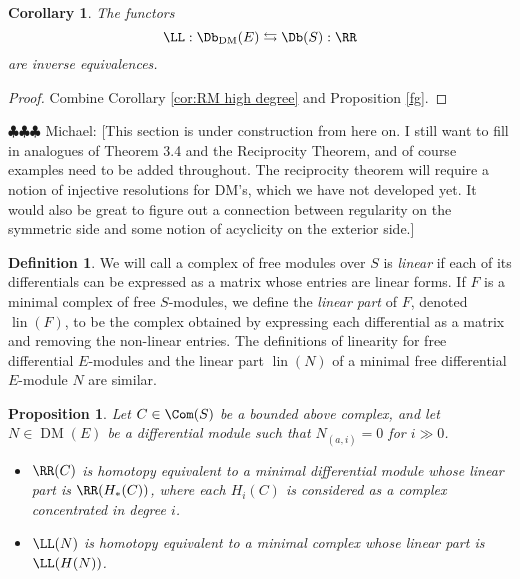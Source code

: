 \documentclass[12pt]{amsart}
\newtheorem{prop}[lemma]{Proposition}
\newtheorem{cor}[lemma]{Corollary}
\theoremstyle{definition}
\newtheorem{defn}[lemma]{Definition}
\theoremstyle{remark}
\newcommand{\michael}[1]{{\color{red} \sf $\clubsuit\clubsuit\clubsuit$ Michael: [#1]}}
\def\on{\operatorname}
\def\DM{\operatorname{DM}}
\begin{document}
\begin{cor} 
\label{bddderived}
The functors
$$
\LL : \Db_{\DM}(E) \leftrightarrows \Db(S) : \RR
$$
are inverse equivalences.
\end{cor}

\begin{proof}
Combine Corollary \ref{cor:RM high degree} and Proposition \ref{fg}.
\end{proof}

\michael{This section is under construction from here on. I still want to fill in analogues of \cite{EFS} Theorem 3.4 and the Reciprocity Theorem, and of course examples need to be added throughout. The reciprocity theorem will require a notion of injective resolutions for DM's, which we have not developed yet. It would also be great to figure out a connection between regularity on the symmetric side and some notion of acyclicity on the exterior side.}


\begin{defn}
We will call a complex of free modules over $S$ is \emph{linear} if each of its differentials can be expressed as a matrix whose entries are linear forms. If $F$ is a minimal complex of free $S$-modules, we define the \emph{linear part} of $F$, denoted $\on{lin}(F)$, to be the complex obtained by expressing each differential as a matrix and removing the non-linear entries. The definitions of linearity for free differential $E$-modules and the linear part $\on{lin}(N)$ of a minimal free differential $E$-module $N$ are similar.
\end{defn}


\begin{prop}
\label{perturbation}
Let $C \in \Com(S)$ be a bounded above complex, and let $N \in \DM(E)$ be a differential module such that $N_{(a, i)} = 0$ for $i \gg 0$. 
\begin{itemize}
\item[(a)] $\RR(C)$ is homotopy equivalent to a minimal differential module whose linear part  is $\RR(H_*(C))$, where each $H_i(C)$ is considered as a complex concentrated in degree $i$. 
\item[(b)] $\LL(N)$ is homotopy equivalent to a minimal complex whose linear part is $\LL(H(N))$.
\end{itemize}
\end{prop}
\end{document}
